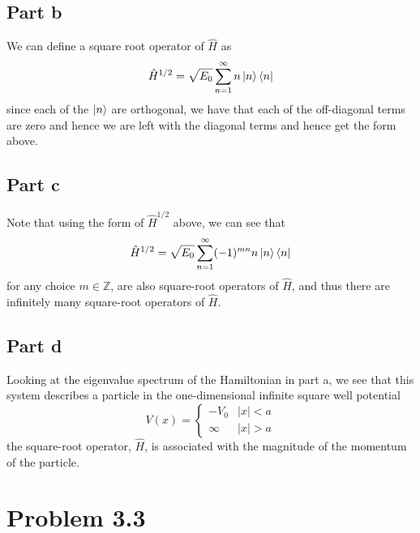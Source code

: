 \documentclass[12pt]{report}
\begin{document}
\subsection*{Part b}
We can define a square root operator of $\hat{H}$ as 
\begin{equation*}
  \hat{H}^{1/2} = \sqrt{E_0} \sum_{n=1}^\infty n \ket{n}\bra{n}
\end{equation*}
since each of the $\ket{n}$ are orthogonal, we have that each of the off-diagonal terms are zero and hence we are left with the diagonal terms and hence get the form above. 

\subsection*{Part c}
Note that using the form of $\hat{H}^{1/2}$ above, we can see that
\begin{equation*}
  \hat{H}^{1/2} = \sqrt{E_0} \sum_{n=1}^\infty (-1)^{mn}n \ket{n}\bra{n}
\end{equation*}
for any choice $m \in \mathbb{Z}$, are also square-root operators of $\hat{H}$, and thus there are infinitely many square-root operators of $\hat{H}$.

\subsection*{Part d}
Looking at the eigenvalue spectrum of the Hamiltonian in part a, we see that this system describes a particle in the one-dimensional infinite square well potential
\begin{equation*}
  V(x) = \begin{cases}
    -V_0 & |x| < a \\
    \infty & |x| > a
  \end{cases}
\end{equation*}
the square-root operator, $\hat{H}$, is associated with the magnitude of the momentum of the particle.

\section*{Problem 3.3}
\end{document}

